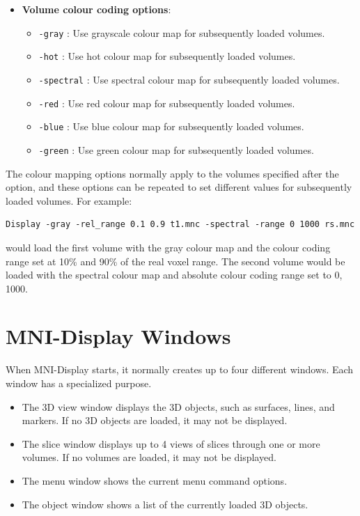\documentclass[11pt,letterpaper]{article}
\newcommand{\ident}[1]{{\tt #1}}
\newcommand{\display}{\mbox{MNI-Display}}
\begin{document}
\begin{itemize}
\begin{itemize}
\end{itemize}
\item {\bf Volume colour coding options}:
\begin{itemize}
\item \ident{-gray} : Use grayscale colour map for subsequently loaded volumes.
\item \ident{-hot} : Use hot colour map for subsequently loaded volumes.
\item \ident{-spectral} : Use spectral colour map for subsequently loaded volumes.
\item \ident{-red} : Use red colour map for subsequently loaded volumes.
\item \ident{-blue} : Use blue colour map for subsequently loaded volumes.
\item \ident{-green} : Use green colour map for subsequently loaded
  volumes.
\end{itemize}
\end{itemize}

The colour mapping options normally apply to the volumes specified after
the option, and these options can be repeated to set different values
for subsequently loaded volumes. For example:

\begin{verbatim}
Display -gray -rel_range 0.1 0.9 t1.mnc -spectral -range 0 1000 rs.mnc
\end{verbatim}
would load the first volume with the gray colour map and
the colour coding range set at 10\% and 90\% of the real voxel
range. The second volume would be loaded with the spectral colour map
and absolute colour coding range set to 0, 1000.

\section{\display{} Windows}
When \display{} starts, it normally creates up to four different
windows. Each window has a specialized purpose.

\begin{itemize}
\item The 3D view window displays the 3D objects, such as surfaces, lines,
and markers. If no 3D objects are loaded, it may not be displayed.
\item The slice window displays up to 4 views of slices through one or more 
volumes. If no volumes are loaded, it may not be displayed.
\item The menu window shows the current menu command options.
\item The object window shows a list of the currently loaded 3D objects.
\end{itemize}
\end{document}
